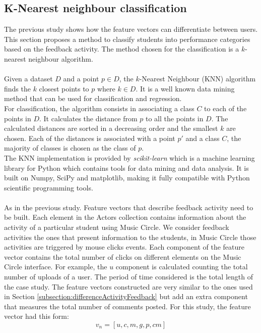 \documentclass[11pt, oneside]{article}   	%
\begin{document}
\subsection{K-Nearest neighbour classification}
The previous study shows how the feature vectors can differentiate between users. This section proposes a method to classify students into performance categories based on the feedback activity. The method chosen for the classification is a $k$-nearest neighbour algorithm.\\\\
Given a dataset $D$ and a point $p \in D$, the $k$-Nearest Neighbour (KNN) algorithm finds the $k$ closest points to $p$ where $k \in D$. It is a well known data mining method that can be used for classification and regression.\\ 
For classification, the algorithm consists in associating a class $C$ to each of the points in $D$. It calculates the distance from $p$ to all the points in $D$. The calculated distances are sorted in a decreasing order and the smallest $k$ are chosen. Each of the distances is associated with a point $p'$ and a class $C$, the majority of classes is chosen as the class of $p$.\\ The KNN implementation is provided by {\it scikit-learn} \cite{scikit} which is a machine learning library for Python which contains tools for data mining and data analysis. It is built on Numpy, SciPy and matplotlib, making it fully compatible with Python scientific programming tools.\\\\
As in the previous study. Feature vectors that describe feedback activity need to be built. Each element in the Actors collection contains information about the activity of a particular student using Music Circle. We consider feedback activities the ones that present information to the students, in Music Circle those activities are triggered by mouse clicks events. Each component of the feature vector contains the total number of clicks on different elements on the Music Circle interface. For example, the $u$ component is calculated counting the total number of uploads of a user. The period of time considered is the total length of the case study. The feature vectors constructed are very similar to the ones used in Section \ref{subsection:differenceActivityFeedback} but add an extra component that measures the total number of comments posted. For this study, the feature vector had this form:
\begin{equation}
v_n=[u,c,m,g,p,cm]
\label{featureVectorKNN}
\end{equation}
\end{document}
